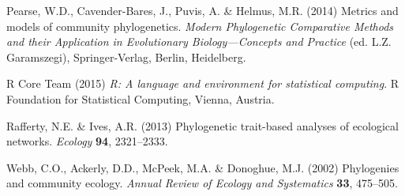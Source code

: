 \documentclass{bioinfo}
\begin{document}
\begin{thebibliography}{30}
Pearse, W.D., Cavender-Bares, J., Puvis, A. \& Helmus, M.R. (2014) Metrics and
  models of community phylogenetics. \emph{Modern Phylogenetic Comparative
  Methods and their Application in Evolutionary Biology---Concepts and
  Practice} (ed. L.Z. Garamszegi), Springer-Verlag, Berlin, Heidelberg.

{R Core Team} (2015) \emph{R: A language and environment for statistical
  computing}. R Foundation for Statistical Computing, Vienna, Austria.

 Rafferty, N.E. \&
  Ives, A.R. (2013) Phylogenetic trait-based analyses of ecological
  networks. \emph{Ecology} \textbf{94}, 2321--2333.

Webb, C.O., Ackerly, D.D., McPeek, M.A. \& Donoghue, M.J. (2002) Phylogenies
  and community ecology. \emph{Annual Review of Ecology and Systematics}
  \textbf{33}, 475--505.
\end{thebibliography}
\end{document}
